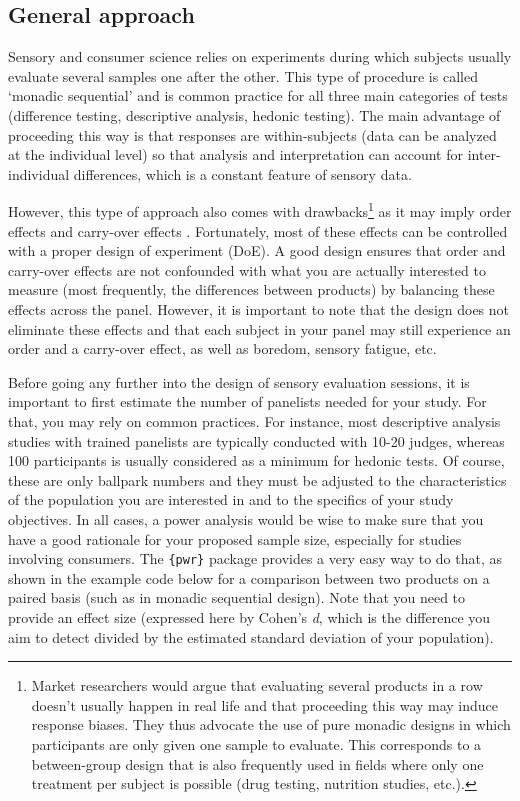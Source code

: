 \documentclass[
]{krantz}
\begin{document}
\hypertarget{general-approach}{%
\subsection{General approach}\label{general-approach}}

Sensory and consumer science relies on experiments during which subjects usually evaluate several samples one after the other. This type of procedure is called `monadic sequential' and is common practice for all three main categories of tests (difference testing, descriptive analysis, hedonic testing). The main advantage of proceeding this way is that responses are within-subjects (data can be analyzed at the individual level) so that analysis and interpretation can account for inter-individual differences, which is a constant feature of sensory data.

However, this type of approach also comes with drawbacks\footnote{Market researchers would argue that evaluating several products in a row doesn't usually happen in real life and that proceeding this way may induce response biases. They thus advocate the use of pure monadic designs in which participants are only given one sample to evaluate. This corresponds to a between-group design that is also frequently used in fields where only one treatment per subject is possible (drug testing, nutrition studies, etc.).} as it may imply order effects and carry-over effects \citep{Macfie1989}. Fortunately, most of these effects can be controlled with a proper design of experiment (DoE). A good design ensures that order and carry-over effects are not confounded with what you are actually interested to measure (most frequently, the differences between products) by balancing these effects across the panel. However, it is important to note that the design does not eliminate these effects and that each subject in your panel may still experience an order and a carry-over effect, as well as boredom, sensory fatigue, etc.

Before going any further into the design of sensory evaluation sessions, it is important to first estimate the number of panelists needed for your study. For that, you may rely on common practices. For instance, most descriptive analysis studies with trained panelists are typically conducted with 10-20 judges, whereas 100 participants is usually considered as a minimum for hedonic tests. Of course, these are only ballpark numbers and they must be adjusted to the characteristics of the population you are interested in and to the specifics of your study objectives. In all cases, a power analysis would be wise to make sure that you have a good rationale for your proposed sample size, especially for studies involving consumers. The \texttt{\{pwr\}} package provides a very easy way to do that, as shown in the example code below for a comparison between two products on a paired basis (such as in monadic sequential design). Note that you need to provide an effect size (expressed here by Cohen's \emph{d}, which is the difference you aim to detect divided by the estimated standard deviation of your population).
\end{document}
